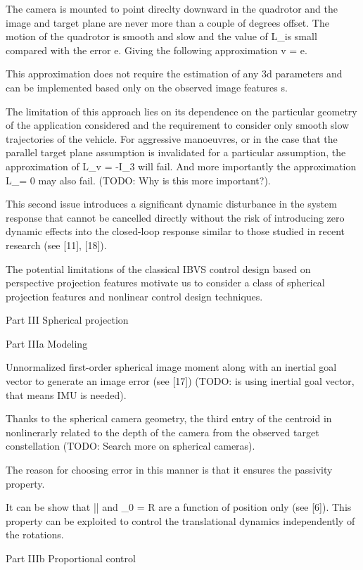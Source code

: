 The camera is mounted to point direclty downward in the quadrotor and the image and target plane are never more than a couple of degrees offset. The motion of the quadrotor is smooth and slow and the value of L_\omega \omega is small compared with the error \lambda e. Giving the following approximation v = \lamda e.

This approximation does not require the estimation of any 3d parameters and can be implemented based only on the observed image features s.

The limitation of this approach lies on its dependence on the particular geometry of the application considered and the requirement to consider only smooth slow trajectories of the vehicle. For aggressive manoeuvres, or in the case that the parallel target plane assumption is invalidated for a particular assumption, the approximation of L_v = -I_3 will fail. And more importantly the approximation L_\omega \omega = 0 may also fail. (TODO: Why is this more important?).

This second issue introduces a significant dynamic disturbance in the system response that cannot be cancelled directly without the risk of introducing zero dynamic effects into the closed-loop response similar to those studied in recent research (see [11], [18]).

The potential limitations of the classical IBVS control design based on perspective projection features motivate us to consider a class of spherical projection features and nonlinear control design techniques.

Part III Spherical projection

Part IIIa Modeling

Unnormalized first-order spherical image moment along with an inertial goal vector to generate an image error (see [17]) (TODO: is using inertial goal vector, that means IMU is needed).

Thanks to the spherical camera geometry, the third entry of the centroid in nonlinerarly related to the depth of the camera from the observed target constellation (TODO: Search more on spherical cameras).

The reason for choosing error in this manner is that it ensures the passivity property.

It can be show that |\delta| and \delta_0 = R \delta are a function of position only (see [6]). This property can be exploited to control the translational dynamics independently of the rotations.

Part IIIb Proportional control

